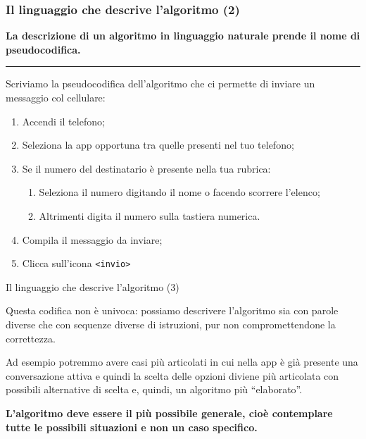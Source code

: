 \documentclass[
    notheorems,
    11pt,
    compress,
    aspectratio=169
]{beamer}
\begin{document}
\begin{frame}[fragile]
    \frametitle{Il linguaggio che descrive l’algoritmo (2)}
    
    \textbf{La descrizione di un algoritmo in linguaggio naturale prende il nome di pseudocodifica.}

    \vspace{0.25cm}
    \hrule
    \vspace{0.25cm}

    Scriviamo la pseudocodifica dell’algoritmo che ci permette di inviare un messaggio col cellulare:

    \begin{block}{}
        \begin{enumerate}
            \item Accendi il telefono;
            \pause
            \item Seleziona la app opportuna tra quelle presenti nel tuo telefono;
            \pause
            \item Se il numero del destinatario è presente nella tua rubrica:
            \begin{enumerate}
                \item Seleziona il numero digitando il nome o facendo scorrere l’elenco;
                \item Altrimenti digita il numero sulla tastiera numerica.
            \end{enumerate}
            \pause
            \item Compila il messaggio da inviare;
            \pause
            \item Clicca sull’icona \verb|<invio>|
        \end{enumerate}
    \end{block}
\end{frame}

\begin{frame}{Il linguaggio che descrive l'algoritmo (3)}
    \begin{block}{}
        Questa codifica non è univoca: possiamo descrivere l’algoritmo sia con parole diverse che con sequenze diverse di istruzioni, pur non compromettendone la correttezza.

        \vspace{0.25cm}
        
        Ad esempio potremmo avere casi più articolati in cui nella app è già presente una conversazione attiva e quindi la scelta delle opzioni diviene più articolata con possibili alternative di scelta e, quindi, un algoritmo più “elaborato”.
    \end{block}

    \vfill

    \textbf{L’algoritmo deve essere il più possibile generale, cioè contemplare tutte le possibili situazioni e non un caso specifico.}
\end{frame}
\end{document}
